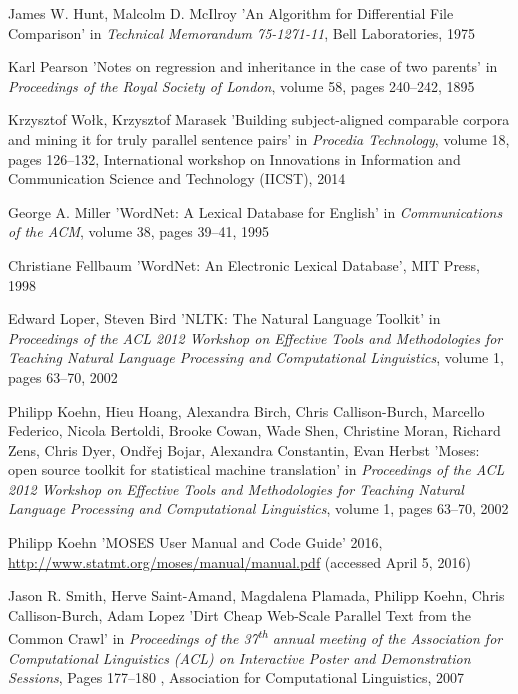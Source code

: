 \begin{thebibliography}{99}
James W. Hunt, Malcolm D. McIlroy
'An Algorithm for Differential File Comparison'
in \textit{Technical Memorandum 75-1271-11},
Bell Laboratories, 
1975

Karl Pearson
'Notes on regression and inheritance in the case of two parents'
in \textit{Proceedings of the Royal Society of London},
volume 58,
pages 240--242,
1895

Krzysztof Wołk, Krzysztof Marasek
'Building subject-aligned comparable corpora and mining it for truly parallel sentence pairs'
in \textit{Procedia Technology},
volume 18,
pages 126--132,
International workshop on Innovations in Information and Communication Science and Technology (IICST),
2014

George A. Miller
'WordNet: A Lexical Database for English'
in \textit{Communications of the ACM},
volume 38,
pages 39--41,
1995

Christiane Fellbaum
'WordNet: An Electronic Lexical Database',
MIT Press, 
1998

Edward Loper, Steven Bird
'NLTK: The Natural Language Toolkit'
in \textit{Proceedings of the ACL 2012 Workshop on Effective Tools and Methodologies for Teaching Natural Language Processing and Computational Linguistics},
volume 1,
pages 63--70,
2002

Philipp Koehn, Hieu Hoang, Alexandra Birch, Chris Callison-Burch, Marcello Federico, Nicola Bertoldi, Brooke Cowan, Wade Shen, Christine Moran, Richard Zens, Chris Dyer, Ondřej Bojar, Alexandra Constantin, Evan Herbst	
'Moses: open source toolkit for statistical machine translation'
in \textit{Proceedings of the ACL 2012 Workshop on Effective Tools and Methodologies for Teaching Natural Language Processing and Computational Linguistics},
volume 1,
pages 63--70,
2002

Philipp Koehn
'MOSES User Manual and Code Guide'
2016,
\url{http://www.statmt.org/moses/manual/manual.pdf} (accessed April 5, 2016)

Jason R. Smith, Herve Saint-Amand, Magdalena Plamada, Philipp Koehn, Chris Callison-Burch, Adam Lopez
'Dirt Cheap Web-Scale Parallel Text from the Common Crawl'
in \textit{Proceedings of the 37\textsuperscript{th} annual meeting of the Association for Computational Linguistics (ACL) on Interactive Poster and Demonstration Sessions},
Pages 177--180 ,
Association for Computational Linguistics,
2007


\end{thebibliography}
